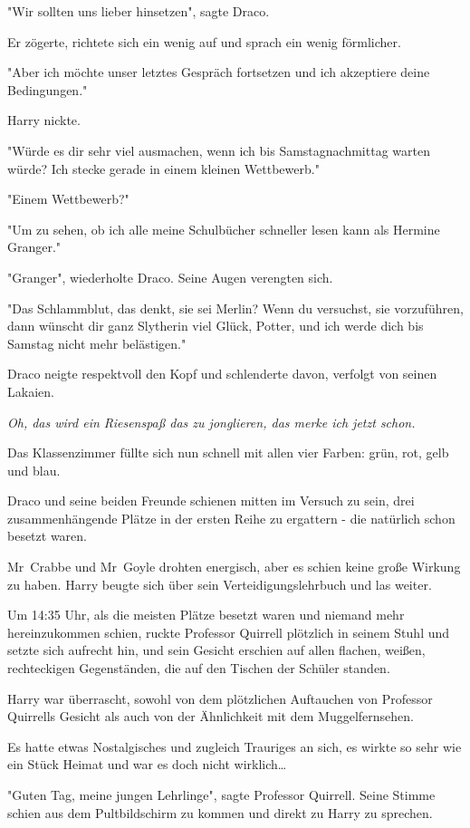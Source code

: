 {"Wir sollten uns lieber hinsetzen", sagte Draco.

Er zögerte, richtete sich ein wenig auf und sprach ein wenig förmlicher.

"Aber ich möchte unser letztes Gespräch fortsetzen und ich akzeptiere deine Bedingungen."

Harry nickte.

"Würde es dir sehr viel ausmachen, wenn ich bis Samstagnachmittag warten würde? Ich stecke gerade in einem kleinen Wettbewerb."

"Einem Wettbewerb?"

"Um zu sehen, ob ich alle meine Schulbücher schneller lesen kann als Hermine Granger."

"Granger", wiederholte Draco. Seine Augen verengten sich.

"Das Schlammblut, das denkt, sie sei Merlin? Wenn du versuchst, sie vorzuführen, dann wünscht dir ganz Slytherin viel Glück, Potter, und ich werde dich bis Samstag nicht mehr belästigen."

Draco neigte respektvoll den Kopf und schlenderte davon, verfolgt von seinen Lakaien.

\emph{Oh, das wird ein Riesenspaß das zu jonglieren, das merke ich jetzt schon.}

Das Klassenzimmer füllte sich nun schnell mit allen vier Farben: grün, rot, gelb und blau.

Draco und seine beiden Freunde schienen mitten im Versuch zu sein, drei zusammenhängende Plätze in der ersten Reihe zu ergattern - die natürlich schon besetzt waren.

Mr~Crabbe und Mr~Goyle drohten energisch, aber es schien keine große Wirkung zu haben. Harry beugte sich über sein Verteidigungslehrbuch und las weiter.

Um 14:35 Uhr, als die meisten Plätze besetzt waren und niemand mehr hereinzukommen schien, ruckte Professor Quirrell plötzlich in seinem Stuhl und setzte sich aufrecht hin, und sein Gesicht erschien auf allen flachen, weißen, rechteckigen Gegenständen, die auf den Tischen der Schüler standen.

Harry war überrascht, sowohl von dem plötzlichen Auftauchen von Professor Quirrells Gesicht als auch von der Ähnlichkeit mit dem Muggelfernsehen.

Es hatte etwas Nostalgisches und zugleich Trauriges an sich, es wirkte so sehr wie ein Stück Heimat und war es doch nicht wirklich…

"Guten Tag, meine jungen Lehrlinge", sagte Professor Quirrell. Seine Stimme schien aus dem Pultbildschirm zu kommen und direkt zu Harry zu sprechen.

}
